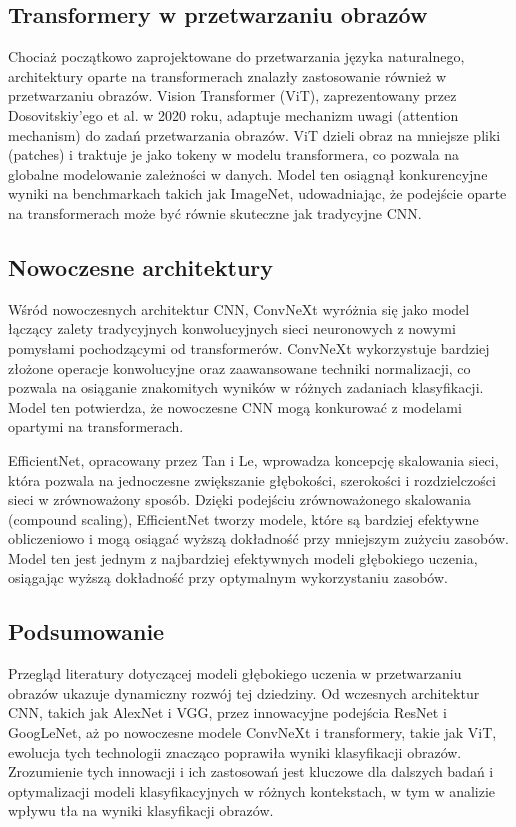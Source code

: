 \subsection*{Transformery w przetwarzaniu obrazów}

Chociaż początkowo zaprojektowane do przetwarzania języka naturalnego, architektury oparte na 
transformerach znalazły zastosowanie również w przetwarzaniu obrazów. Vision Transformer (ViT), 
zaprezentowany przez Dosovitskiy'ego et al. w 2020 roku, adaptuje mechanizm uwagi 
(attention mechanism) do zadań przetwarzania obrazów. ViT dzieli obraz na mniejsze pliki 
(patches) i traktuje je jako tokeny w modelu transformera, co pozwala na globalne modelowanie 
zależności w danych. Model ten osiągnął konkurencyjne wyniki na benchmarkach takich jak ImageNet, 
udowadniając, że podejście oparte na transformerach może być równie skuteczne jak tradycyjne CNN.

\subsection*{Nowoczesne architektury}

Wśród nowoczesnych architektur CNN, ConvNeXt wyróżnia się jako model łączący zalety tradycyjnych 
konwolucyjnych sieci neuronowych z nowymi pomysłami pochodzącymi od transformerów. ConvNeXt 
wykorzystuje bardziej złożone operacje konwolucyjne oraz zaawansowane techniki normalizacji, 
co pozwala na osiąganie znakomitych wyników w różnych zadaniach klasyfikacji. Model ten potwierdza, 
że nowoczesne CNN mogą konkurować z modelami opartymi na transformerach.

EfficientNet, opracowany przez Tan i Le, wprowadza koncepcję skalowania sieci, która pozwala na 
jednoczesne zwiększanie głębokości, szerokości i rozdzielczości sieci w zrównoważony sposób. 
Dzięki podejściu zrównoważonego skalowania (compound scaling), EfficientNet tworzy modele, 
które są bardziej efektywne obliczeniowo i mogą osiągać wyższą dokładność przy mniejszym zużyciu 
zasobów. Model ten jest jednym z najbardziej efektywnych modeli głębokiego uczenia, osiągając 
wyższą dokładność przy optymalnym wykorzystaniu zasobów.

\subsection*{Podsumowanie}

Przegląd literatury dotyczącej modeli głębokiego uczenia w przetwarzaniu obrazów ukazuje dynamiczny 
rozwój tej dziedziny. Od wczesnych architektur CNN, takich jak AlexNet i VGG, przez innowacyjne 
podejścia ResNet i GoogLeNet, aż po nowoczesne modele ConvNeXt i transformery, takie jak ViT, 
ewolucja tych technologii znacząco poprawiła wyniki klasyfikacji obrazów. Zrozumienie tych 
innowacji i ich zastosowań jest kluczowe dla dalszych badań i optymalizacji modeli klasyfikacyjnych 
w różnych kontekstach, w tym w analizie wpływu tła na wyniki klasyfikacji obrazów.

